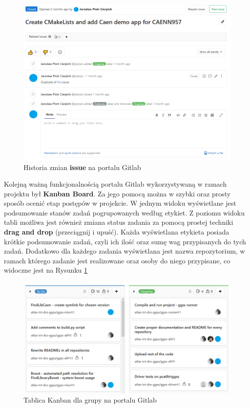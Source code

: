 \begin{figure}[H]
\centering
\caption{Historia zmian \textbf{issue} na portalu Gitlab}
\includegraphics[width=\textwidth]{res/png/issueOngoing}
\end{figure}

\newpage

Kolejną ważną funkcjonalnością portalu Gitlab wykorzystywaną w ramach projektu był \textbf{Kanban Board}. Za jego pomocą można w szybki oraz prosty sposób ocenić etap postępów w projekcie. W jednym widoku wyświetlane jest podsumowanie stanów zadań pogrupowanych według etykiet. Z poziomu widoku tabli możliwa jest również zmiana status zadania za pomocą prostej techniki \textbf{drag and drop} (przeciągnij i upuść). Każda wyświetlana etykieta posiada krótkie podsumowanie zadań, czyli ich ilość oraz sumę wag przypisanych do tych zadań. Dodatkowo dla każdego zadania wyświetlana jest nazwa repozytorium, w ramach którego zadanie jest realizowane oraz osoby do niego przypisane, co widoczne jest na Rysunku \ref{fig:kanban}

\begin{figure}[H]
\centering
\caption{Tablica Kanban dla grupy na portalu Gitlab}
\label{fig:kanban}
\includegraphics[width=\textwidth]{res/png/kanban}
\end{figure}

